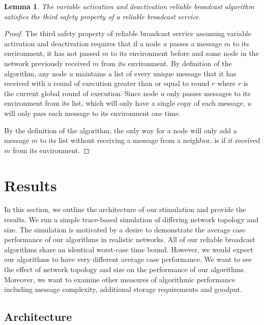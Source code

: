 \documentclass[english]{article}
\newtheorem{lemma}[theorem]{Lemma}
\begin{document}
\begin{lemma}
\label{DeactivationRBSafety3}
The variable activation and deactivation reliable broadcast algorithm satisfies the third safety property of a reliable broadcast service.
\end{lemma}
\begin{proof}

The third safety property of reliable broadcast service assuming variable activation and deactivation requires that if a node $u$ passes a message $m$ to its environment, it has not passed $m$ to its environment before and some node in the network previously received $m$ from its environment. By definition of the algorithm, any node $u$ maintains a list of every unique message that it has received with a round of execution greater than or equal to round $r$ where $r$ is the current global round of execution. Since node $u$ only passes messages to its environment from its list, which will only have a single copy of each message, $u$ will only pass each message to its environment one time. 

By the definition of the algorithm, the only way for a node will only add a message $m$ to its list without receiving a message from a neighbor, is if it received $m$ from its environment.


\end{proof}



\section{Results}

In this section, we outline the architecture of our stimulation and provide the results. We run a simple trace-based simulation of differing network topology and size. The simulation is motivated by a desire to demonstrate the average case performance of our algorithms in realistic networks. All of our reliable broadcast algorithms share an identical worst-case time bound. However, we would expect our algorithms to have very different average case performance. We want to see the effect of network topology and size on the performance of our algorithms. Moreover, we want to examine other measures of algorithmic performance including message complexity, additional storage requirements and goodput.

\subsection{Architecture}
\end{document}
